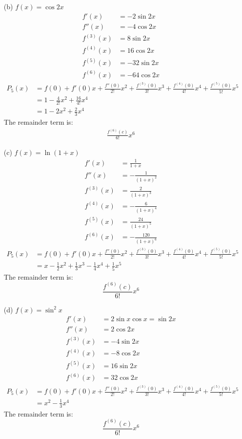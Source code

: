 \documentclass[UTF8]{ctexart}
\begin{document}
\begin{enumerate}
\begin{itemize}
\item[(b)] $f(x) = \cos 2x$
\begin{align*}
f'(x) &= -2 \sin 2x \\
f''(x) &= -4 \cos 2x \\
f^{(3)}(x) &= 8 \sin 2x \\
f^{(4)}(x) &= 16\cos 2x \\
f^{(5)}(x) &= -32 \sin 2x \\
f^{(6)}(x) &= -64 \cos 2x
\end{align*}
\begin{align*}
P_5(x) &= f(0) + f'(0)x + \frac{f''(0)}{2!} x^2 + \frac{f^{(3)}(0)}{3!} x^3 + \frac{f^{(4)}(0)}{4!} x^4 + \frac{f^{(5)}(0)}{5!} x^5 \\
&= 1 - \frac{4}{2!}x^2 + \frac{16}{4!}x^4 \\
&= 1 - 2x^2 + \frac{2}{3}x^4
\end{align*}
The remainder term is:
\begin{align*}
\frac{f^{(6)}(c)}{6!}x^6
\end{align*}

\item[(c)] $f(x) = \ln(1 + x)$
\begin{align*}
f'(x) &= \frac{1}{1 + x} \\
f''(x) &= -\frac{1}{(1+x)^2} \\
f^{(3)}(x) &= \frac{2}{(1+x)^3} \\
f^{(4)}(x) &= -\frac{6}{(1+x)^4} \\
f^{(5)}(x) &= \frac{24}{(1+x)^5}\\
f^{(6)}(x) &= - \frac{120}{(1+x)^6}
\end{align*}
\begin{align*}
P_5(x) &= f(0) + f'(0)x + \frac{f''(0)}{2!}x^2 + \frac{f^{(3)}(0)}{3!} x^3 + \frac{f^{(4)}(0)}{4!} x^4 + \frac{f^{(5)}(0)}{5!} x^5 \\
&= x - \frac{1}{2}x^2 + \frac{1}{3}x^3 - \frac{1}{4}x^4 + \frac{1}{5}x^5
\end{align*}
The remainder term is:
\[
	\frac{f^{(6)}(c)}{6!}x^6
\]

\item[(d)] $f(x) = \sin^2 x$
\begin{align*}
f'(x) &= 2 \sin x \cos x = \sin 2x \\
f''(x) &= 2 \cos 2x \\
f^{(3)} (x) &= -4 \sin 2x \\
f^{(4)} (x) &= -8 \cos 2x \\
f^{(5)} (x) &= 16 \sin 2x \\
f^{(6)} (x) &= 32 \cos 2x
\end{align*}
\begin{align*}
P_5(x) &= f(0) + f'(0)x + \frac{f''(0)}{2!}x^2 + \frac{f^{(3)}(0)}{3!} x^3 + \frac{f^{(4)}(0)}{4!} x^4 + \frac{f^{(5)}(0)}{5!} x^5 \\
&= x^2 - \frac{1}{3}x^4
\end{align*}
The remainder term is:
\[
	\frac{f^{(6)}(c)}{6!} x^6
\]


\end{itemize}
\end{enumerate}
\end{document}
